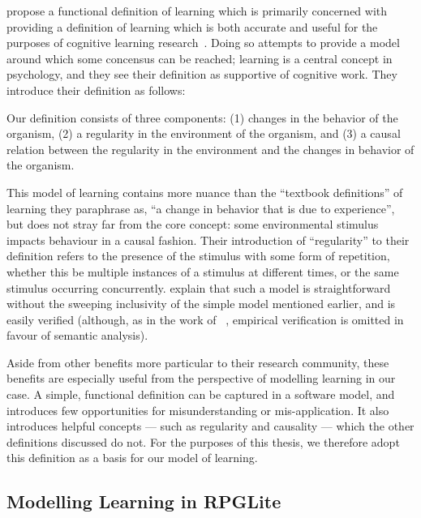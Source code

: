\citeauthor{de2013learning} propose a functional definition of learning which is
primarily concerned with providing a definition of learning which is both
accurate and useful for the purposes of cognitive learning
research~\cite{de2013learning}. Doing so attempts to provide a model around
which some concensus can be reached; learning is a central concept in
psychology, and they see their definition as supportive of cognitive work. They
introduce their definition as follows:

\begin{displayquote}
Our definition consists of three components: (1) changes in the behavior of the
organism, (2) a regularity in the environment of the organism, and (3) a causal
relation between the regularity in the environment and the changes in behavior
of the organism.
\end{displayquote}

This model of learning contains more nuance than the ``textbook definitions'' of
learning they paraphrase as, ``a change in behavior that is due to experience'',
but does not stray far from the core concept: some environmental stimulus
impacts behaviour in a causal fashion. Their introduction of ``regularity'' to
their definition refers to the presence of the stimulus with some form of
repetition, whether this be multiple instances of a stimulus at different times,
or the same stimulus occurring concurrently. \citeauthor{de2013learning} explain
that such a model is straightforward without the sweeping inclusivity of the
simple model mentioned earlier, and is easily verified (although, as in the work
of \citeauthor{lachman1997learning}~\cite{lachman1997learning}, empirical
verification is omitted in favour of semantic analysis).

Aside from other benefits more particular to their research community, these
benefits are especially useful from the perspective of modelling learning in our
case. A simple, functional definition can be captured in a software model, and
introduces few opportunities for misunderstanding or mis-application. It also
introduces helpful concepts --- such as regularity and causality --- which the
other definitions discussed do not. For the purposes of this thesis, we
therefore adopt this definition as a basis for our model of learning.

\subsection{Modelling Learning in RPGLite}\label{subsec:defining_our_models_of_learning}

